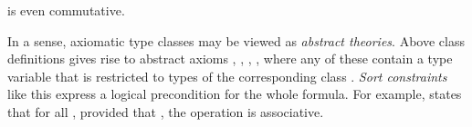 \begin{isabellebody}
\begin{isamarkuptext}
 is even commutative.%
\end{isamarkuptext}%
%
%
\begin{isamarkuptext}%
In a sense, axiomatic type classes may be viewed as \emph{abstract
 theories}.  Above class definitions gives rise to abstract axioms
 , , , , where any of these contain a type variable 
 that is restricted to types of the corresponding class .
 \emph{Sort constraints} like this express a logical precondition for
 the whole formula.  For example,  states that for all
 \isa{{\isasymtau}}, provided that , the operation
 \isa{{\isasymodot}\ {\isasymColon}\ {\isasymtau}\ {\isasymRightarrow}\ {\isasymtau}\ {\isasymRightarrow}\ {\isasymtau}} is associative.


\end{isamarkuptext}
\end{isabellebody}
